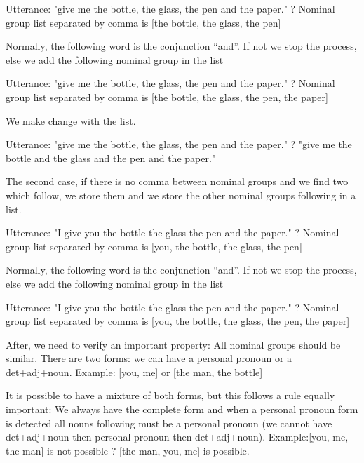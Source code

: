 \documentclass[twoside,a4paper,10pt]{report}
\begin{document}
\small
\begin{verbatimtab}
  Utterance: "give me the bottle, the glass, the pen and the paper." 
  ? Nominal group list separated by comma is [the bottle, the glass, the pen]
\end{verbatimtab}
\normalsize
Normally, the following word is the conjunction “and”. If not we stop the process, else we add the following nominal group in the list


\small
\begin{verbatimtab}
  Utterance: "give me the bottle, the glass, the pen and the paper." 
  ? Nominal group list separated by comma is [the bottle, the glass, the pen, the paper]
\end{verbatimtab}
\normalsize
We make change with the list.


\small
\begin{verbatimtab}
  Utterance: "give me the bottle, the glass, the pen and the paper." 
  ? "give me the bottle and the glass and the pen and the paper." 
\end{verbatimtab}
\normalsize

The second case, if there is no comma between nominal groups and we find two which follow, we store them and we store the other nominal groups following in a list. 


\small
\begin{verbatimtab}
  Utterance: "I give you the bottle the glass the pen and the paper." 
  ? Nominal group list separated by comma is [you, the bottle, the glass, the pen]
\end{verbatimtab}
\normalsize
Normally, the following word is the conjunction “and”. If not we stop the process, else we add the following nominal group in the list


\small
\begin{verbatimtab}
  Utterance: "I give you the bottle the glass the pen and the paper." 
  ? Nominal group list separated by comma is [you, the bottle, the glass, the pen, the paper]
\end{verbatimtab}
\normalsize
After, we need to verify an important property: All nominal groups should be similar. There are two forms: we can have a personal pronoun or a det+adj+noun. Example: [you, me] or [the man, the bottle] 

It is possible to have a mixture of both forms, but this follows a rule equally important: We always have the complete form and when a personal pronoun form is detected all nouns following must be a personal pronoun (we cannot have det+adj+noun then personal pronoun then det+adj+noun). Example:[you, me, the man] is not possible ? [the man, you, me] is possible.
\end{document}
